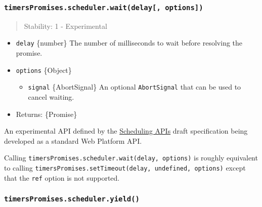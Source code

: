 \subsubsection{\texorpdfstring{\texttt{timersPromises.scheduler.wait(delay{[},\ options{]})}}{timersPromises.scheduler.wait(delay{[}, options{]})}}\label{timerspromises.scheduler.waitdelay-options}

\begin{quote}
Stability: 1 - Experimental
\end{quote}

\begin{itemize}
\tightlist
\item
  \texttt{delay} \{number\} The number of milliseconds to wait before
  resolving the promise.
\item
  \texttt{options} \{Object\}

  \begin{itemize}
  \tightlist
  \item
    \texttt{signal} \{AbortSignal\} An optional \texttt{AbortSignal}
    that can be used to cancel waiting.
  \end{itemize}
\item
  Returns: \{Promise\}
\end{itemize}

An experimental API defined by the
\href{https://github.com/WICG/scheduling-apis}{Scheduling APIs} draft
specification being developed as a standard Web Platform API.

Calling \texttt{timersPromises.scheduler.wait(delay,\ options)} is
roughly equivalent to calling
\texttt{timersPromises.setTimeout(delay,\ undefined,\ options)} except
that the \texttt{ref} option is not supported.

\begin{Shaded}
\begin{Highlighting}[]
 \OperatorTok{;}

\NormalTok{(}\NormalTok{)}\OperatorTok{;} 
\end{Highlighting}
\end{Shaded}

\subsubsection{\texorpdfstring{\texttt{timersPromises.scheduler.yield()}}{timersPromises.scheduler.yield()}}\label{timerspromises.scheduler.yield}


